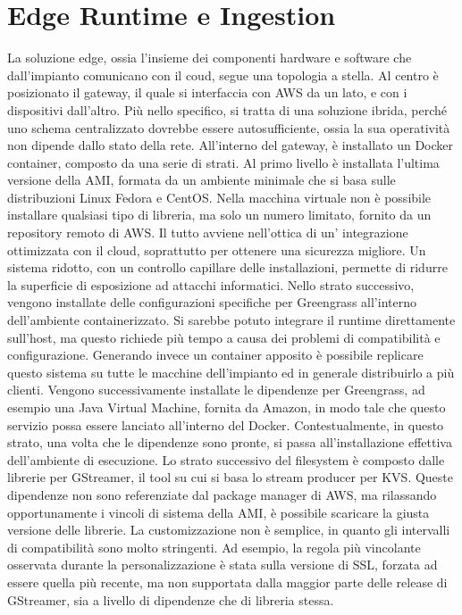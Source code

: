\newpage
\section{Edge Runtime e Ingestion}

La soluzione edge, ossia l'insieme dei componenti hardware e software che dall'impianto comunicano con il coud, segue una topologia a stella. Al centro è posizionato il gateway, il quale si interfaccia con AWS da un lato, e con i dispositivi dall'altro. Più nello specifico, si tratta di una soluzione ibrida, perché uno schema centralizzato dovrebbe essere autosufficiente, ossia la sua operatività non dipende dallo stato della rete. All'interno del gateway, è installato un Docker container, composto da una serie di strati. Al primo livello è installata l'ultima versione della AMI, formata da un ambiente minimale che si basa sulle distribuzioni Linux Fedora e CentOS. Nella macchina virtuale non è possibile installare qualsiasi tipo di libreria, ma solo un numero limitato, fornito da un repository remoto di AWS. Il tutto avviene nell'ottica di un' integrazione ottimizzata con il cloud, soprattutto per ottenere una sicurezza migliore. Un sistema ridotto, con un controllo capillare delle installazioni, permette di ridurre la superficie di esposizione ad attacchi informatici. Nello strato successivo, vengono installate delle configurazioni specifiche per Greengrass all'interno dell'ambiente containerizzato. Si sarebbe potuto integrare il runtime direttamente sull'host, ma questo richiede più tempo a causa dei problemi di compatibilità e configurazione. Generando invece un container apposito è possibile replicare questo sistema su tutte le macchine dell'impianto ed in generale distribuirlo a più clienti. Vengono successivamente installate le dipendenze per Greengrass, ad esempio una Java Virtual Machine, fornita da Amazon, in modo tale che questo servizio possa essere lanciato all'interno del Docker. Contestualmente, in questo strato, una volta che le dipendenze sono pronte, si passa all'installazione effettiva dell'ambiente di esecuzione. Lo strato successivo del filesystem è composto dalle librerie per GStreamer, il tool su cui si basa lo stream producer per KVS. Queste dipendenze non sono referenziate dal package manager di AWS, ma rilassando opportunamente i vincoli di sistema della AMI, è possibile scaricare la giusta versione delle librerie. La customizzazione non è semplice, in quanto gli intervalli di compatibilità sono molto stringenti. Ad esempio, la regola più vincolante osservata durante la personalizzazione è stata sulla versione di SSL, forzata ad essere quella più recente, ma non supportata dalla maggior parte delle release di GStreamer, sia a livello di dipendenze che di libreria stessa.







